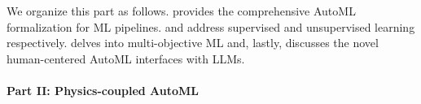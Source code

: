 \documentclass[a4paper,12pt,times,numbered,print,index]{Classes/PhDThesisPSnPDF}
\begin{document}
We organize this part as follows.
 provides the comprehensive AutoML formalization for ML pipelines.
 and  address supervised and unsupervised learning respectively.
 delves into multi-objective ML and, lastly,  discusses the novel human-centered AutoML interfaces with LLMs.

\paragraph{Part II: Physics-coupled AutoML}
\end{document}
